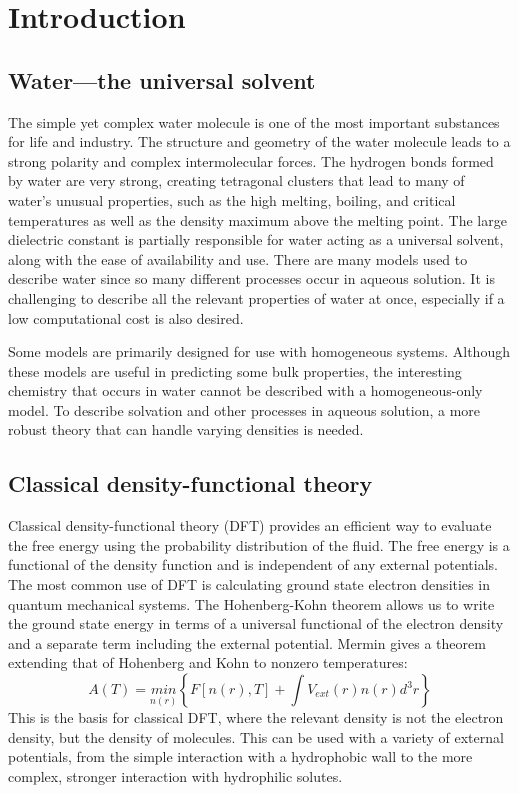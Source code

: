 \documentclass[letterpaper,twocolumn,amsmath,amssymb,prb]{revtex4-1}
\begin{document}
\section{Introduction}

\subsection{Water---the universal solvent}

The simple yet complex water molecule is one of the most important 
substances for life and industry. The structure and geometry of the 
water molecule leads to a strong polarity and complex intermolecular
forces. The hydrogen bonds formed by water are very strong, creating
tetragonal clusters that lead to many of water's unusual properties,
such as the high melting, boiling, and critical temperatures as well as the
density maximum above the melting point.
The large dielectric constant is partially responsible for
water acting as a universal solvent, along with the ease of availability and
use.
There are many models used to describe water since so many different
processes occur in aqueous solution. It is challenging to describe all the 
relevant properties of water at once, especially if a low computational cost is
also desired.

Some models are primarily designed for use with homogeneous systems. Although
these 
models are useful in predicting some bulk properties, the interesting
chemistry that occurs in water cannot be described with a homogeneous-only
model. To
describe solvation and other processes in aqueous solution, a more robust theory
that 
can handle varying densities is needed.

\subsection{Classical density-functional theory}

Classical density-functional theory (DFT) provides an efficient way to evaluate
the free energy using the probability distribution of the fluid. The free energy 
is a functional
of the density function and is independent of any external
potentials\cite{ebner1976density}. The most common use of DFT is calculating ground
state electron densities in quantum mechanical systems. The Hohenberg-Kohn
theorem\cite{hohenberg1964inhomogeneous} allows us to write the ground state
energy in terms of a universal functional of the electron density and a separate
term including the external potential. Mermin\cite{mermin1965thermal} gives a
theorem extending that of Hohenberg and Kohn to nonzero temperatures:
\begin{equation}
  A(T) = \underset{n(r)}{min}\left\{ F[n(r),T] + \int V_{ext}(r) n(r)
d^3r\right\}
\end{equation}
This is the basis for classical DFT, where the relevant density is not the
electron density,
but the density of molecules. This can be used with a variety of 
external potentials, from the simple interaction with a 
hydrophobic wall to the more complex, stronger interaction with hydrophilic
solutes.
\end{document}
